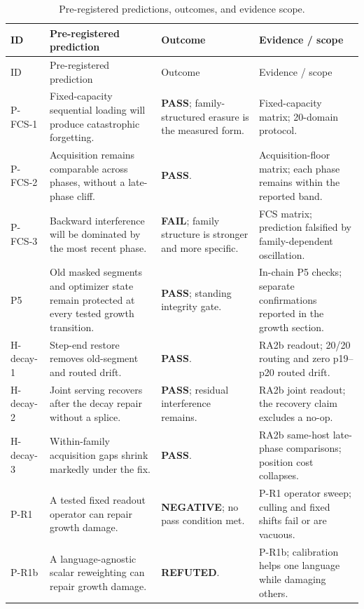 \documentclass[11pt]{article}
\theoremstyle{definition}\newtheorem{definition}{Definition}
\theoremstyle{remark}\newtheorem{remark}{Remark}
\begin{document}
\small
\begin{longtable}{@{}>{\raggedright\arraybackslash}p{} >{\raggedright\arraybackslash}p{} >{\raggedright\arraybackslash}p{} >{\raggedright\arraybackslash}p{}@{}}
\caption{Pre-registered predictions, outcomes, and evidence scope.}\label{tab:predictions}\\

\toprule
ID & Pre-registered prediction & Outcome & Evidence / scope \\
\midrule
\endfirsthead
\toprule
ID & Pre-registered prediction & Outcome & Evidence / scope \\
\midrule
\endhead
P-FCS-1 & Fixed-capacity sequential loading will produce catastrophic forgetting. & \textbf{PASS}; family-structured erasure is the measured form. & Fixed-capacity matrix; 20-domain protocol. \\
P-FCS-2 & Acquisition remains comparable across phases, without a late-phase cliff. & \textbf{PASS}. & Acquisition-floor matrix; each phase remains within the reported band. \\
P-FCS-3 & Backward interference will be dominated by the most recent phase. & \textbf{FAIL}; family structure is stronger and more specific. & FCS matrix; prediction falsified by family-dependent oscillation. \\
P5 & Old masked segments and optimizer state remain protected at every tested growth transition. & \textbf{PASS}; standing integrity gate. & In-chain P5 checks; separate confirmations reported in the growth section. \\
H-decay-1 & Step-end restore removes old-segment and routed drift. & \textbf{PASS}. & RA2b readout; 20/20 routing and zero p19--p20 routed drift. \\
H-decay-2 & Joint serving recovers after the decay repair without a splice. & \textbf{PASS}; residual interference remains. & RA2b joint readout; the recovery claim excludes a no-op. \\
H-decay-3 & Within-family acquisition gaps shrink markedly under the fix. & \textbf{PASS}. & RA2b same-host late-phase comparisons; position cost collapses. \\
P-R1 & A tested fixed readout operator can repair growth damage. & \textbf{NEGATIVE}; no pass condition met. & P-R1 operator sweep; culling and fixed shifts fail or are vacuous. \\
P-R1b & A language-agnostic scalar reweighting can repair growth damage. & \textbf{REFUTED}. & P-R1b; calibration helps one language while damaging others. \\

\end{longtable}
\end{document}
